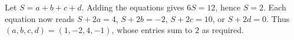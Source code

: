 Let $S=a+b+c+d$. Adding the equations gives $6S=12$, hence $S=2$. Each equation now reads $S+2a=4$, $S+2b=-2$, $S+2c=10$, or $S+2d=0$. Thus $\boxed{(a,b,c,d)=(1,-2,4,-1)}$, whose entries sum to $2$ as required.
